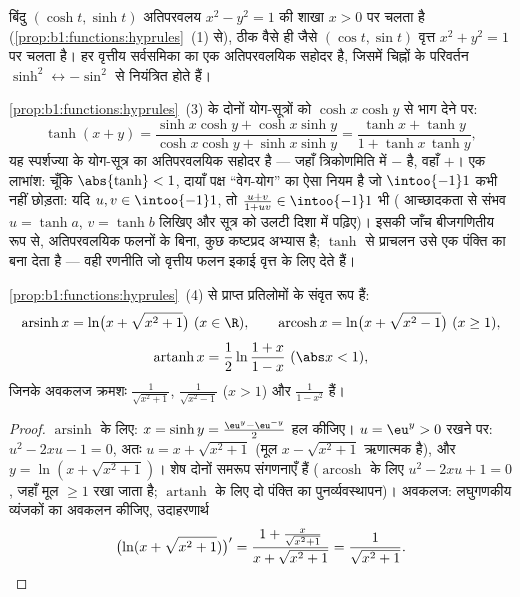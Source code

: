 \begin{remark}[``अतिपरवलयिक'' क्यों?]
बिंदु $(\cosh t, \sinh t)$ अतिपरवलय $x^2 - y^2 = 1$ की शाखा $x > 0$ पर चलता
है (\cref{prop:b1:functions:hyprules}~(1) से), ठीक वैसे ही जैसे $(\cos t,
\sin t)$ वृत्त $x^2 + y^2 = 1$ पर चलता है। हर वृत्तीय सर्वसमिका का एक
अतिपरवलयिक सहोदर है, जिसमें चिह्नों के परिवर्तन $\sinh^2 \leftrightarrow
-\sin^2$ से नियंत्रित होते हैं।
\end{remark}

\begin{example}[$\tanh$ का योग-सूत्र]\label{ex:b1:functions:tanhadd}
\cref{prop:b1:functions:hyprules}~(3) के दोनों योग-सूत्रों को $\cosh x\cosh
y$ से भाग देने पर:
\[
\tanh(x + y)
= \frac{\sinh x\cosh y + \cosh x\sinh y}
{\cosh x\cosh y + \sinh x\sinh y}
= \frac{\tanh x + \tanh y}{1 + \tanh x\,\tanh y} ,
\]
यह स्पर्शज्या के योग-सूत्र का अतिपरवलयिक सहोदर है --- जहाँ त्रिकोणमिति में
$-$ है, वहाँ $+$। एक लाभांश: चूँकि $\abs{\tanh} < 1$, दायाँ पक्ष ``वेग-योग''
का ऐसा नियम है जो $\intoo{-1}1$ कभी नहीं छोड़ता: यदि $u, v \in \intoo{-1}1$,
तो $\frac{u + v}{1 + uv} \in \intoo{-1}1$ भी ( आच्छादकता से संभव $u =
\tanh a$, $v = \tanh b$ लिखिए और सूत्र को उलटी दिशा में पढ़िए)। इसकी जाँच
बीजगणितीय रूप से, अतिपरवलयिक फलनों के बिना, कुछ कष्टप्रद अभ्यास है; $\tanh$
से प्राचलन उसे एक पंक्ति का बना देता है --- वही रणनीति जो वृत्तीय फलन इकाई
वृत्त के लिए देते हैं।
\end{example}

\begin{proposition}\label{prop:b1:functions:invhyp}
\cref{prop:b1:functions:hyprules}~(4) से प्राप्त प्रतिलोमों के संवृत रूप
हैं:
\[
\operatorname{arsinh} x = \ln\bigl(x + \sqrt{x^2 + 1}\bigr)
\ (x \in \R),
\qquad
\operatorname{arcosh} x = \ln\bigl(x + \sqrt{x^2 - 1}\bigr)
\ (x \geq 1),
\]
\[
\operatorname{artanh} x = \frac 12 \ln\frac{1 + x}{1 - x}
\ (\abs x < 1),
\]
जिनके अवकलज क्रमशः $\frac{1}{\sqrt{x^2+1}}$, $\frac{1}{\sqrt{x^2-1}}$ ($x >
1$) और $\frac{1}{1 - x^2}$ हैं।
\end{proposition}

\begin{proof}
$\operatorname{arsinh}$ के लिए: $x = \sinh y = \frac{\eu^y - \eu^{-y}}{2}$
हल कीजिए। $u = \eu^y > 0$ रखने पर: $u^2 - 2xu - 1 = 0$, अतः $u = x +
\sqrt{x^2 + 1}$ (मूल $x - \sqrt{x^2+1}$ ऋणात्मक है), और $y = \ln(x +
\sqrt{x^2+1})$। शेष दोनों समरूप संगणनाएँ हैं ($\operatorname{arcosh}$ के लिए
$u^2 - 2xu + 1 = 0$, जहाँ मूल $\geq 1$ रखा जाता है; $\operatorname{artanh}$
के लिए दो पंक्ति का पुनर्व्यवस्थापन)। अवकलज: लघुगणकीय व्यंजकों का अवकलन
कीजिए, उदाहरणार्थ
\[
\bigl(\ln(x + \sqrt{x^2+1})\bigr)'
= \frac{1 + \frac{x}{\sqrt{x^2+1}}}{x + \sqrt{x^2+1}}
= \frac{1}{\sqrt{x^2 + 1}} . \qedhere
\]
\end{proof}

